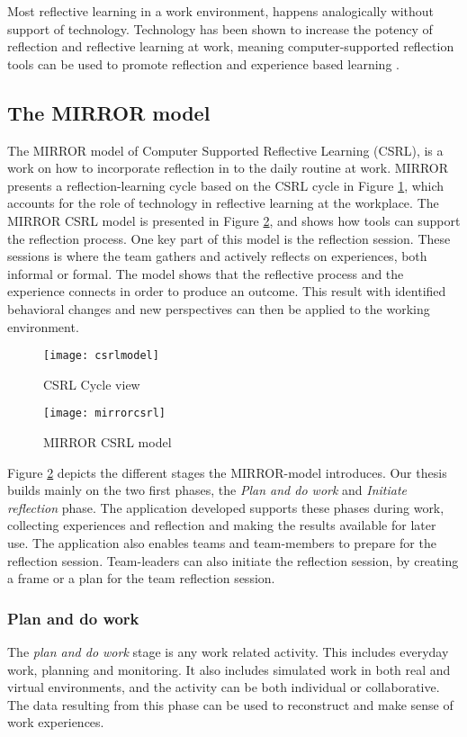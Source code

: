 Most reflective learning in a work environment, happens analogically without support of technology\citep{Schindler_Eppler_2003}. Technology has been shown to increase the potency of reflection and reflective learning at work, meaning computer-supported reflection tools can be used to promote reflection and experience based learning \citep{krogstiereflectionwork, Lin1999}. 

\subsection{The MIRROR model}
\label{mirrorsection}
The MIRROR model of Computer Supported Reflective Learning (CSRL), is a work on how to incorporate reflection in to the daily routine at work. 
MIRROR presents a reflection-learning cycle based on the CSRL cycle in Figure \ref{csrlmodel}, which accounts for the role of technology in reflective learning at the workplace. The MIRROR CSRL model is presented in Figure \ref{mirrormodel}, and shows how tools can support the reflection process. One key part of this model is the reflection session. These sessions is where the team gathers and actively reflects on experiences, both informal or formal. The model shows that the reflective process and the experience connects in order to produce an outcome. This result with identified behavioral changes and new perspectives can then be applied to the working environment. 
\begin{figure}[!htpb]
\centering
	\texttt{[image: csrlmodel]}
\caption{CSRL Cycle view \citep{Krogstie2011}}
\label{csrlmodel}
\end{figure}

\begin{figure}[h!]
\centering
	\texttt{[image: mirrorcsrl]}
\caption{MIRROR CSRL model \citep{csrlmirror121}}
\label{mirrormodel}
\end{figure}

Figure \ref{mirrormodel} depicts the different stages the MIRROR-model introduces. Our thesis builds mainly on the two first phases, the \emph{Plan and do work} and \emph{Initiate reflection} phase. The application developed supports these phases during work, collecting experiences and reflection and making the results available for later use. The application also enables teams and team-members to prepare for the reflection session. Team-leaders can also initiate the reflection session, by creating a frame or a plan for the team reflection session. 
\clearpage
\subsubsection{Plan and do work}
The \emph{plan and do work} stage is any work related activity. This includes everyday work, planning and monitoring. It also includes simulated work in both real and virtual environments, and the activity can be both individual or collaborative. The data resulting from this phase can be used to reconstruct and make sense of work experiences. 

